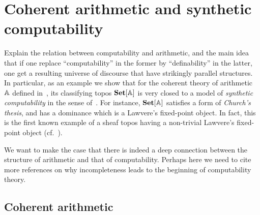 \NewDocumentCommand{}
\NewDocumentCommand{}

\NewDocumentCommand{}
\NewDocumentCommand{}

\chapter{Coherent arithmetic and synthetic computability}\label{ch:coharith}

Explain the relation between computability and arithmetic, and the main idea that if one replace ``computability'' in the former by ``definability'' in the latter, one get a resulting universe of discourse that have strikingly parallel structures. In particular, as an example we show that for the coherent theory of arithmetic $\mathbb{A}$ defined in~\citet{ye_categorical_2026}, its classifying topos $\mathbf{Set}[\mathbb{A}]$ is very closed to a model of \emph{synthetic computability} in the sense of~\citet{bauer_first_2006}. For instance, $\mathbf{Set}[\mathbb{A}]$ satisfies a form of \emph{Church's thesis}, and has a dominance which is a Lawvere's fixed-point object. In fact, this is the first known example of a sheaf topos having a non-trivial Lawvere's fixed-point object (cf.~\citet{bauer2026laugh}).

We want to make the case that there is indeed a deep connection between the structure of arithmetic and that of computability. Perhaps here we need to cite more references on why incompleteness leads to the beginning of computability theory.

\section{Coherent arithmetic}

